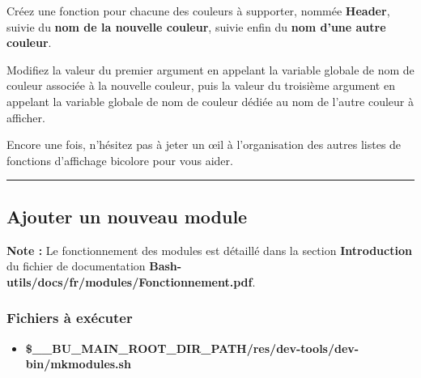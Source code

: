 \documentclass[a4paper,10pt]{article}
\begin{document}
\begin{justify}
	Créez une fonction pour chacune des couleurs à supporter, nommée \textbf{\color{mauve}Header}, suivie du \textbf{\color{mauve}nom de la nouvelle couleur}, suivie enfin du \textbf{\color{mauve}nom d'une autre couleur}.
\end{justify}

\begin{justify}
    Modifiez la valeur du premier argument en appelant la variable globale de nom de couleur associée à la nouvelle couleur, puis la valeur du troisième argument en appelant la variable globale de nom de couleur dédiée au nom de l'autre couleur à afficher.
\end{justify}

\begin{justify}
    Encore une fois, n'hésitez pas à jeter un œil à l'organisation des autres listes de fonctions d'affichage bicolore pour vous aider.
\end{justify}



\color{green}\par\noindent\rule{\textwidth}{0.4pt}\color{white}

\color{green}
\subsection{Ajouter un nouveau module}\color{white}

\begin{justify}
    \textbf{Note :} Le fonctionnement des modules est détaillé dans la section \textbf{\color{red}Introduction} du fichier de documentation \textbf{\color{lime}Bash-utils/docs/fr/modules/Fonctionnement.pdf}.
\end{justify}

\color{blue}
\subsubsection{Fichiers à exécuter}\color{white}

\begin{itemize}
    \item \textbf{\color{orange}\$\_\_BU\_MAIN\_ROOT\_DIR\_PATH\color{lime}/res/dev-tools/dev-bin/mkmodules.sh}\\[1\baselineskip]
\end{itemize}
\end{document}

